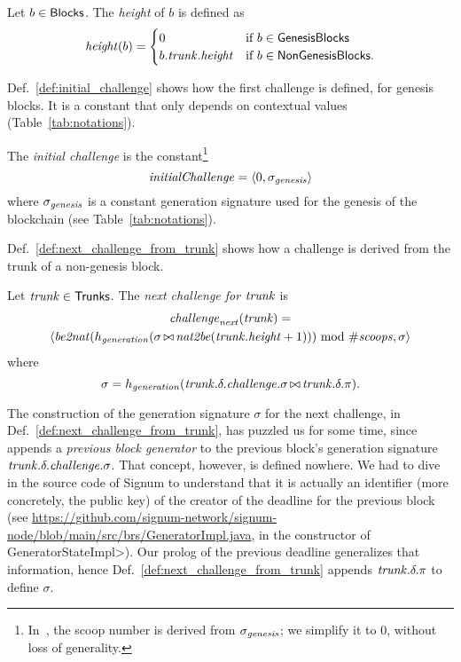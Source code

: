 \begin{definition}\label{def:block_height}
  Let $b\in{\mathsf{Blocks}}$. The \emph{height} of $b$ is defined as
  \[
  {\mathit{height}}(b)=\begin{cases}
  0 & \text{if $b\in{\mathsf{GenesisBlocks}}$}\\
  b.{\mathit{trunk}}.{\mathit{height}} & \text{if $b\in{\mathsf{NonGenesisBlocks}}$.}
  \end{cases}
  \]
\end{definition}
%
Def.~\ref{def:initial_challenge} shows how the first challenge is defined, for genesis blocks.
It is a constant that only depends on contextual values (Table~\ref{tab:notations}).
%
\begin{definition}[$\initialchallenge$]\label{def:initial_challenge}
  The \emph{initial challenge} is the constant\footnote{In~\cite{SignumPlotting},
  the scoop number is derived from $\sigma_{\mathit{genesis}}$; we simplify it to $0$, without loss
  of generality.}
  \[
    {\mathit{initialChallenge}}=
    \langle 0,\sigma_{\mathit{genesis}}\rangle
  \]
  where $\sigma_{\mathit{genesis}}$ is a constant generation signature used for the genesis of the blockchain
  (see Table~\ref{tab:notations}).
\end{definition}
%
Def.~\ref{def:next_challenge_from_trunk}
shows how a challenge is derived from the trunk of a non-genesis block.
%
\begin{definition}[$\nextchallenge(\trunk)$]\label{def:next_challenge_from_trunk}
  Let ${\mathit{trunk}}\in{\mathsf{Trunks}}$. The \emph{next challenge for ${\mathit{trunk}}$} is
  \begin{multline*}
    {\mathit{challenge}}_{\mathit{next}}({\mathit{trunk}})=\\
    \langle{\mathit{be2nat}}(h_{\mathit{generation}}(\sigma\operatorname*{\bowtie}{\mathit{nat2be}}({\mathit{trunk}}.{\mathit{height}}+1)))\text{ mod }{\#\mathit{scoops}},\sigma\rangle
  \end{multline*}
  where
  \[
  \sigma=h_{\mathit{generation}}({\mathit{trunk}}.\delta.{\mathit{challenge}}.\sigma\operatorname*{\bowtie}{\mathit{trunk}}.\delta.\pi).  
  \]
\end{definition}
%
The construction of the generation signature $\sigma$ for the next challenge,
in Def.~\ref{def:next_challenge_from_trunk},
has puzzled us for some time, since~\cite{SignumPlotting} appends a \emph{previous block generator}
to the previous block's generation signature ${\mathit{trunk}}.\delta.{\mathit{challenge}}.\sigma$.
That concept, however, is defined nowhere.
We had to dive in the source code of Signum to understand that it is actually
an identifier (more concretely, the public key)
of the creator of the deadline for the previous block
(see \url{https://github.com/signum-network/signum-node/blob/main/src/brs/GeneratorImpl.java},
in the constructor of \<GeneratorStateImpl>).
Our prolog of the previous deadline generalizes that information, hence
Def.~\ref{def:next_challenge_from_trunk} appends ${\mathit{trunk}}.\delta.\pi$ to define $\sigma$.

